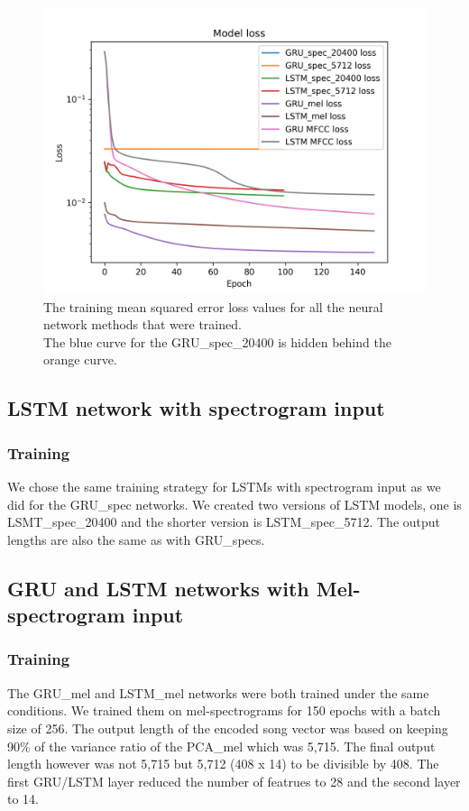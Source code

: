 \begin{figure}[h]
    \centering
	\includegraphics[width=120mm]{./img/all_training_graphs.png}
	\caption[]{The training mean squared error loss values for all the neural network methods that were trained. \\
	\tiny{The blue curve for the GRU\_spec\_20400 is hidden behind the orange curve.}}
	\label{fig:all_model_training}
\end{figure}


\subsection{LSTM network with spectrogram input}\label{ssec:LSTM_spec_experiments}

\subsubsection{Training}
We chose the same training strategy for LSTMs with spectrogram input as we did for the GRU\_spec networks. We created two versions of LSTM models, one is LSMT\_spec\_20400 and the shorter version is LSTM\_spec\_5712. The output lengths are also the same as with GRU\_specs.

\subsection{GRU and LSTM networks with Mel-spectrogram input}\label{ssec:GRU_LSTM_mel_experiments}

\subsubsection{Training}
The GRU\_mel and LSTM\_mel networks were both trained under the same conditions. We trained them on mel-spectrograms for 150 epochs with a batch size of 256. The output length of the encoded song vector was based on keeping 90\% of the variance ratio of the PCA\_mel which was 5,715. The final output length however was not 5,715 but 5,712 (408 x 14) to be divisible by 408. The first GRU/LSTM layer reduced the number of featrues to 28 and the second layer to 14.

